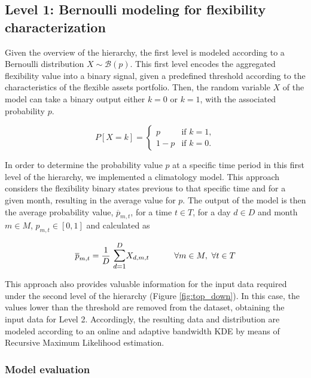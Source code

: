 \subsection{Level 1: Bernoulli modeling for flexibility characterization}\label{sect:Level1}
Given the overview of the hierarchy, the first level is modeled according to a Bernoulli distribution $X \sim \mathcal{B}(p)$. This first level encodes the aggregated flexibility value into a binary signal, given a predefined threshold according to the characteristics of the flexible assets portfolio. Then, the random variable $X$  of the model can take a binary output either $k=0$ or $k=1$, with the associated probability $p$.

\begin{equation}
  P[X = k] =
  \begin{cases} 
    p     & \text{if $k = 1$}, \\
    1 - p & \text{if $k = 0$}.
  \end{cases}
\end{equation}


In order to determine the probability value $p$ at a specific time period in this first level of the hierarchy, we implemented a climatology model. This approach considers the flexibility binary states previous to that specific time and for a given month, resulting in the average value for $p$. The output of the model is then the average probability value,  $\overline{p}_{m,t}$,  for a time $t \in T$, for a day $d \in D$ and month $m \in M$, $p_{m,t} \in [0,1]$ and calculated as 

\begin{equation}
    \overline{p}_{m,t} = \frac{1}{D} \ \mathlarger{\sum_{d=1}^{D}} X_{d,m,t} \hspace{30pt} \forall m \in M, \ \forall t \in T
\end{equation}

This approach also provides valuable information for the input data required under the second level of the hierarchy (Figure \ref{fig:top_down}). In this case, the values lower than the threshold are removed from the dataset, obtaining the input data for Level 2. Accordingly, the resulting data and distribution are modeled according to an online and adaptive bandwidth KDE by means of Recursive Maximum Likelihood estimation.


\subsubsection{Model evaluation}

